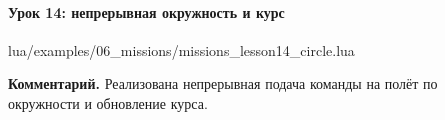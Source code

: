 \paragraph{Урок 14: непрерывная окружность и курс}
\begin{codefile}{lua/examples/06_missions/missions_lesson14_circle.lua}
\end{codefile}
\textbf{Комментарий.} Реализована непрерывная подача команды на полёт по окружности и обновление курса.
